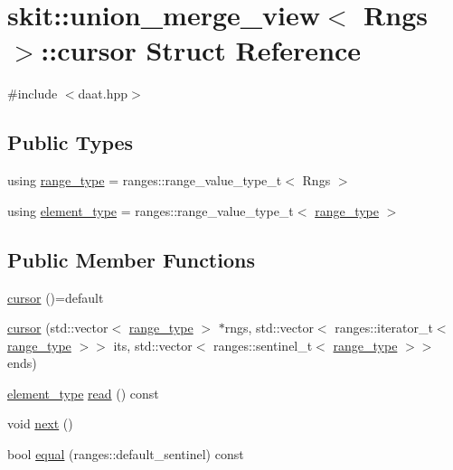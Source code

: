 \hypertarget{structskit_1_1union__merge__view_1_1cursor}{}\section{skit\+:\+:union\+\_\+merge\+\_\+view$<$ Rngs $>$\+:\+:cursor Struct Reference}
\label{structskit_1_1union__merge__view_1_1cursor}


{\ttfamily \#include $<$daat.\+hpp$>$}

\subsection*{Public Types}
\begin{DoxyCompactItemize}
\item 
using \hyperlink{structskit_1_1union__merge__view_1_1cursor_aca3870894a5b4e031b79496118e9ca60}{range\+\_\+type} = ranges\+::range\+\_\+value\+\_\+type\+\_\+t$<$ Rngs $>$
\item 
using \hyperlink{structskit_1_1union__merge__view_1_1cursor_acb2065245b1bc94caf985a6500636d27}{element\+\_\+type} = ranges\+::range\+\_\+value\+\_\+type\+\_\+t$<$ \hyperlink{structskit_1_1union__merge__view_1_1cursor_aca3870894a5b4e031b79496118e9ca60}{range\+\_\+type} $>$
\end{DoxyCompactItemize}
\subsection*{Public Member Functions}
\begin{DoxyCompactItemize}
\item 
\hyperlink{structskit_1_1union__merge__view_1_1cursor_a943b05a78fcdcde93bbc8515519bd269}{cursor} ()=default
\item 
\hyperlink{structskit_1_1union__merge__view_1_1cursor_a5f1be7482ff2541522fa0a7ca143a3ae}{cursor} (std\+::vector$<$ \hyperlink{structskit_1_1union__merge__view_1_1cursor_aca3870894a5b4e031b79496118e9ca60}{range\+\_\+type} $>$ $\ast$rngs, std\+::vector$<$ ranges\+::iterator\+\_\+t$<$ \hyperlink{structskit_1_1union__merge__view_1_1cursor_aca3870894a5b4e031b79496118e9ca60}{range\+\_\+type} $>$$>$ its, std\+::vector$<$ ranges\+::sentinel\+\_\+t$<$ \hyperlink{structskit_1_1union__merge__view_1_1cursor_aca3870894a5b4e031b79496118e9ca60}{range\+\_\+type} $>$$>$ ends)
\item 
\hyperlink{structskit_1_1union__merge__view_1_1cursor_acb2065245b1bc94caf985a6500636d27}{element\+\_\+type} \hyperlink{structskit_1_1union__merge__view_1_1cursor_a82cd0e27963a5e5b2f9a2eb168570842}{read} () const
\item 
void \hyperlink{structskit_1_1union__merge__view_1_1cursor_a232ee25c4f929f4e2ad86e613138f31d}{next} ()
\item 
bool \hyperlink{structskit_1_1union__merge__view_1_1cursor_a664936e54ecbffd658386bc26abcd2a9}{equal} (ranges\+::default\+\_\+sentinel) const
\end{DoxyCompactItemize}

